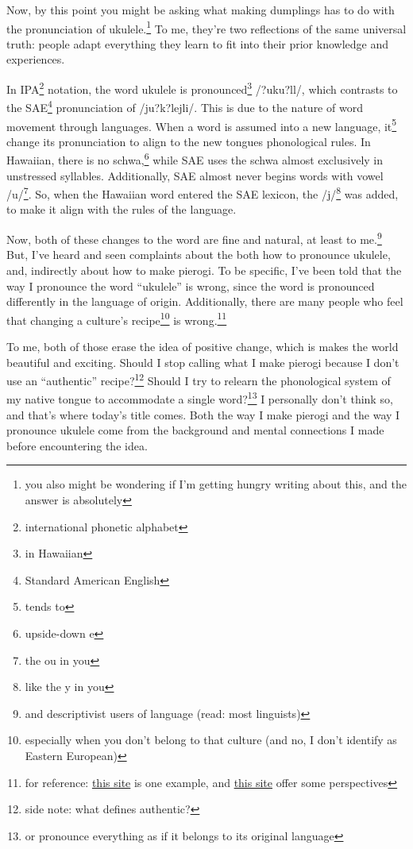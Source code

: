 \documentclass[12pt]{article}[titlepage]
\newcommand{\say}[1]{``#1''}
\newcommand{\1}{\={a}}
\newcommand{\2}{\={e}}
\newcommand{\3}{\={\i}}
\newcommand{\4}{\=o}
\newcommand{\5}{\=u}
\newcommand{\6}{\={A}}
\renewcommand{\,}{\textsuperscript{,}}
\begin{document}
Now, by this point you might be asking what making dumplings has to do with the pronunciation of ukulele.\footnote{you also might be wondering if I'm getting hungry writing about this, and the answer is absolutely}
To me, they're two reflections of the same universal truth: people adapt everything they learn to fit into their prior knowledge and experiences.

In IPA\footnote{international phonetic alphabet} notation, the word ukulele is pronounced\footnote{in Hawaiian} /?uku?l\textepsilon{}l\textepsilon{}/, which contrasts to the SAE\footnote{Standard American English} pronunciation of /ju?k\textschwa?lejli/.
This is due to the nature of word movement through languages.
When a word is assumed into a new language, it\footnote{tends to} change its pronunciation to align to the new tongues phonological rules.
In Hawaiian, there is no schwa,\footnote{upside-down e} while SAE uses the schwa almost exclusively in unstressed syllables.
Additionally, SAE almost never begins words with vowel /u/\footnote{the ou in you}.
So, when the Hawaiian word entered the SAE lexicon, the /j/\footnote{like the y in you} was added, to make it align with the rules of the language.

Now, both of these changes to the word are fine and natural, at least to me.\footnote{and descriptivist users of language (read: most linguists)}
But, I've heard and seen complaints about the both how to pronounce ukulele, and, indirectly about how to make pierogi.
To be specific, I've been told that the way I pronounce the word \say{ukulele} is wrong, since the word is pronounced differently in the language of origin.
Additionally, there are many people who feel that changing a culture's recipe\footnote{especially when you don't belong to that culture (and no, I don't identify as Eastern European)} is wrong.\footnote{for reference: \href{https://www.npr.org/sections/thesalt/2016/03/22/471309991/when-chefs-become-famous-cooking-other-cultures-food}{this site} is one example, and \href{http://www.baystbull.com/in-food-culture-is-appropriation-actually-possible/}{this site} offer some perspectives}

To me, both of those erase the idea of positive change, which is makes the world beautiful and exciting.
Should I stop calling what I make pierogi because I don't use an \say{authentic} recipe?\footnote{side note: what defines authentic?}
Should I try to relearn the phonological system of my native tongue to accommodate a single word?\footnote{or pronounce everything as if it belongs to its original language}
I personally don't think so, and that's where today's title comes.
Both the way I make pierogi and the way I pronounce ukulele come from the background and mental connections I made before encountering the idea.
\end{document}
